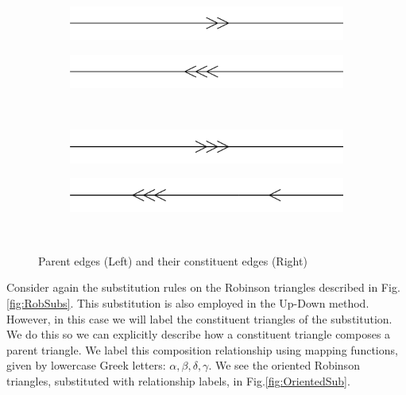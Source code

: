 \documentclass[
  oneside,
  11pt, a4paper,
  footinclude=true,
  headinclude=true,
  cleardoublepage=empty
]{scrbook}
\begin{document}
\begin{figure}[H]
        \begin{subfigure}[t]{0.4\textwidth}
                \includegraphics[width=\textwidth]{a3}
        \end{subfigure}\hfill
        \begin{subfigure}[t]{0.4\textwidth}
                \includegraphics[width=\textwidth]{a3inflate}
        \end{subfigure}\\                           
        
        \begin{subfigure}[t]{0.4\textwidth}
                \includegraphics[width=\textwidth]{a4}
        \end{subfigure}\hfill
        \begin{subfigure}[t]{0.4\textwidth}
                \includegraphics[width=\textwidth]{a4inflate}
        \end{subfigure}\\   
        \caption[Edge Composition Rules]{Parent edges (Left) and their constituent edges (Right)}     
        \label{fig:EdgeRules}
\end{figure} 


\pagebreak
Consider again the substitution rules on the Robinson triangles described in Fig.\ref{fig:RobSubs}. This substitution is also employed in the Up-Down method. However, in this case we will label the constituent triangles of the substitution. We do this so we can explicitly describe how a constituent triangle composes a parent triangle. We label this composition relationship using mapping functions, given by lowercase Greek letters: $\alpha, \beta, \delta, \gamma$. We see the oriented Robinson triangles, substituted with relationship labels, in Fig.\ref{fig:OrientedSub}.
\end{document}
